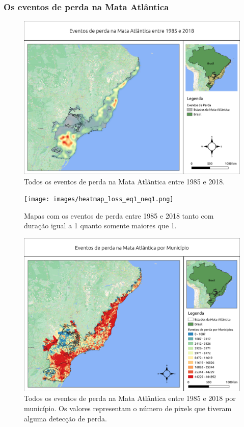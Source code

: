 \subsubsection{Os eventos de perda na Mata Atlântica}

\begin{figure}[H]
    \centering
    \includegraphics[scale=.5]{images/heatmap_loss_masked85_maskedgain.png}
    \caption{Todos os eventos de perda na Mata Atlântica entre 1985 e 2018.}
    \label{fig:heat_loss_masked85_maskedgain}
\end{figure}

\begin{figure}[H]
    \centering
    \texttt{[image: images/heatmap\_loss\_eq1\_neq1.png]}
    \caption{Mapas com os eventos de perda entre 1985 e 2018 tanto com duração igual a 1 quanto somente maiores que 1.}
    \label{fig:heat_loss_eq1_neq1}
\end{figure}

\begin{figure}[H]
    \centering
    \includegraphics[scale=.5]{images/mun_loss_mun_masked85_maskedgain.png}
    \caption{Todos os eventos de perda na Mata Atlântica entre 1985 e 2018 por município. Os valores representam o número de pixels que tiveram alguma detecção de perda.}
    \label{fig:mun_loss_masked85_maskedgain}
\end{figure}

